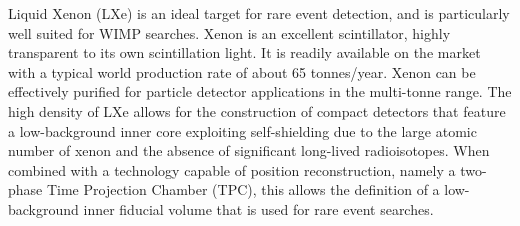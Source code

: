 %
Liquid Xenon (LXe) is an ideal target for rare event detection, and is particularly well suited for WIMP searches. Xenon is an excellent scintillator, highly transparent to its own scintillation light. It is readily available on the market with a typical world production rate of about 65 tonnes/year. Xenon can be effectively purified for particle detector applications in the multi-tonne range. The high density of LXe allows for the construction of compact detectors that feature a low-background inner core 
exploiting self-shielding
due to the large atomic number of xenon and the absence of significant long-lived radioisotopes. 
When combined with a technology capable of position reconstruction, namely a two-phase Time Projection Chamber (TPC), this allows the definition of a low-background inner fiducial volume that is used for rare event searches.

%

